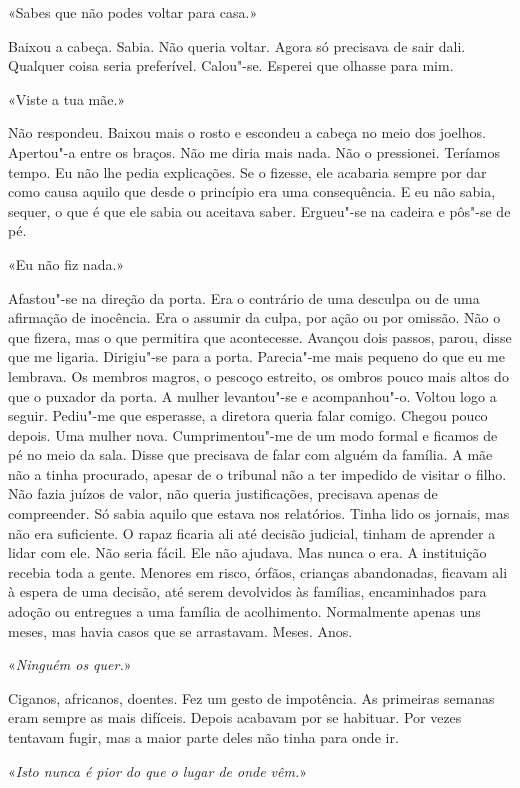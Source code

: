 «Sabes que não podes voltar para casa.»

Baixou a cabeça. Sabia. Não queria voltar. Agora só precisava de sair
dali. Qualquer coisa seria preferível. Calou"-se. Esperei que olhasse
para mim.

«Viste a tua mãe.»

Não respondeu. Baixou mais o rosto e escondeu a cabeça no meio dos
joelhos. Apertou"-a entre os braços. Não me diria mais nada. Não o
pressionei. Teríamos tempo. Eu não lhe pedia explicações. Se o fizesse,
ele acabaria sempre por dar como causa aquilo que desde o princípio era
uma consequência. E eu não sabia, sequer, o que é que ele sabia ou
aceitava saber. Ergueu"-se na cadeira e pôs"-se de pé.

«Eu não fiz nada.»

Afastou"-se na direção da porta. Era o contrário de uma desculpa ou de
uma afirmação de inocência. Era o assumir da culpa, por ação ou por
omissão. Não o que fizera, mas o que permitira que acontecesse. Avançou
dois passos, parou, disse que me ligaria. Dirigiu"-se para a porta.
Parecia"-me mais pequeno do que eu me lembrava. Os membros magros, o
pescoço estreito, os ombros pouco mais altos do que o puxador da porta.
A mulher levantou"-se e acompanhou"-o. Voltou logo a seguir. Pediu"-me
que esperasse, a diretora queria falar comigo. Chegou pouco depois. Uma
mulher nova. Cumprimentou"-me de um modo formal e ficamos de pé no meio
da sala. Disse que precisava de falar com alguém da família. A mãe não a
tinha procurado, apesar de o tribunal não a ter impedido de visitar o
filho. Não fazia juízos de valor, não queria justificações, precisava
apenas de compreender. Só sabia aquilo que estava nos relatórios. Tinha
lido os jornais, mas não era suficiente. O rapaz ficaria ali até decisão
judicial, tinham de aprender a lidar com ele. Não seria fácil. Ele não
ajudava. Mas nunca o era. A instituição recebia toda a gente. Menores em
risco, órfãos, crianças abandonadas, ficavam ali à espera de uma
decisão, até serem devolvidos às famílias, encaminhados para adoção ou
entregues a uma família de acolhimento. Normalmente apenas uns meses,
mas havia casos que se arrastavam. Meses. Anos.

«\emph{Ninguém os quer.}»

Ciganos, africanos, doentes. Fez um gesto de impotência. As primeiras
semanas eram sempre as mais difíceis. Depois acabavam por se habituar.
Por vezes tentavam fugir, mas a maior parte deles não tinha para onde
ir.

«\emph{Isto nunca é pior do que o lugar de onde vêm.}»

